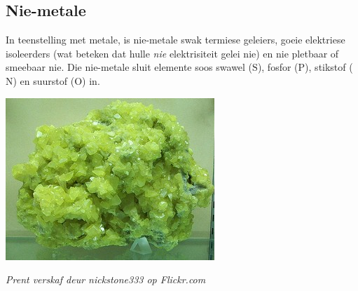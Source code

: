             \subsection*{Nie-metale}
            \nopagebreak
\begin{minipage}{.5\textwidth}
        \label{m38708*id66021}In teenstelling met metale, is nie-metale swak termiese geleiers, goeie elektriese isoleerders (wat beteken dat hulle \textsl{nie} elektrisiteit gelei nie) en nie pletbaar of smeebaar nie. Die nie-metale sluit elemente soos swawel ($\text{S}$), fosfor ($\text{P}$), stikstof ($\text{N}$) en suurstof ($\text{O}$) in.\par 
\end{minipage}
\begin{minipage}{.5\textwidth}
\begin{center}
 \includegraphics[width=.4\textwidth]{photos/sulphurby-nickstone333.jpg}\par
\textit{Prent verskaf deur nickstone333 op Flickr.com}
\end{center}
\end{minipage}
      \label{m38708*uid94}
